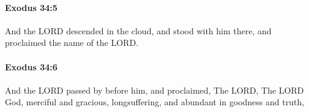 		\paragraph{Exodus 34:5} %
			\label{EXODUS-34-5}

			And the LORD descended in the cloud, and stood with him there, and proclaimed the name of the LORD.


		\paragraph{Exodus 34:6} %
			\label{EXODUS-34-6}

			And the LORD passed by before him, and proclaimed, The LORD, The LORD God, merciful and gracious, longsuffering, and abundant in goodness and truth,


